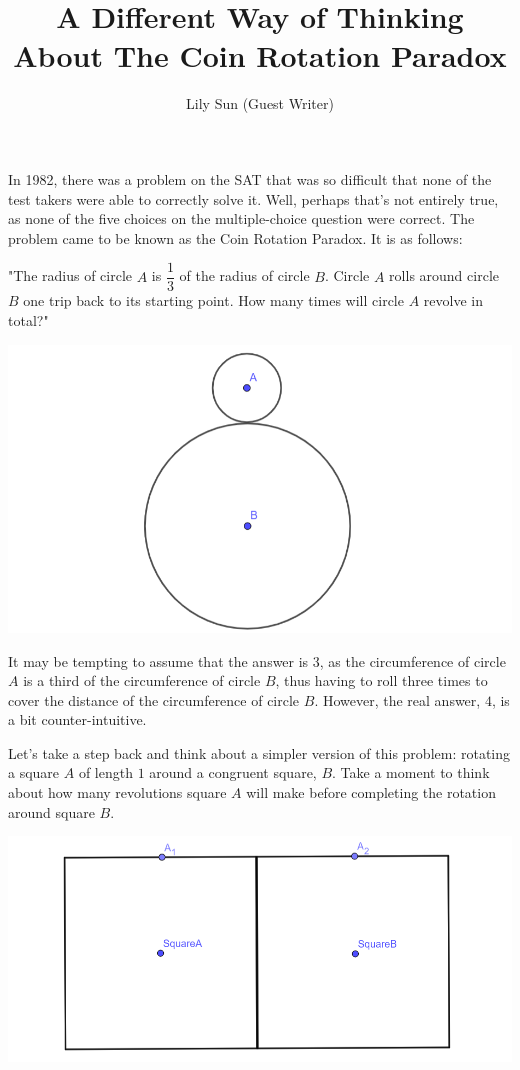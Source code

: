 \documentclass{article}
\title{A Different Way of Thinking About The Coin Rotation Paradox}
\author{Lily Sun (Guest Writer)}
\date{}
\begin{document}
\maketitle
In 1982, there was a problem on the SAT that was so difficult that none of the test takers were able to correctly solve it. Well, perhaps that's not entirely true, as none of the five choices on the multiple-choice question were correct. The problem came to be known as the Coin Rotation Paradox. It is as follows:

"The radius of circle $A$ is $\dfrac{1}{3}$ of the radius of circle $B$. Circle $A$ rolls around circle $B$ one trip back to its starting point. How many times will circle $A$ revolve in total?"

\begin{center}
\includegraphics[scale=0.5]{images/circleAandcircleB.png}
\end{center}

It may be tempting to assume that the answer is $3$, as the circumference of circle $A$ is a third of the circumference of circle $B$, thus having to roll three times to cover the distance of the circumference of circle $B$. However, the real answer, $4$, is a bit counter-intuitive.

Let's take a step back and think about a simpler version of this problem: rotating a square $A$ of length $1$ around a congruent square, $B$. Take a moment to think about how many revolutions square $A$ will make before completing the rotation around square $B$.

\begin{center}
\includegraphics[scale=0.5, angle = -0.5]{images/squareAandsquareB.png}
\end{center}
\end{document}

